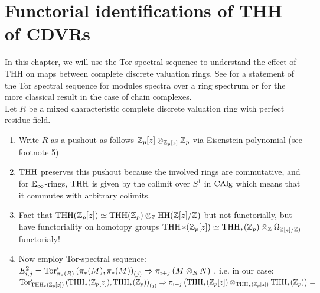\chapter{Functorial identifications of THH of CDVRs}
In this chapter, we will use the Tor-spectral sequence to understand the effect of THH on maps between complete discrete valuation rings.
See \cite[~Proposition 7.2.1.19]{lurie2017higher} for a statement of the Tor spectral sequence for modules spectra over a ring spectrum 
or \cite[\href{https://stacks.math.columbia.edu/tag/061Y}{Tag 061Y}]{stacks-project} for the more classical result in the case of chain complexes.
\\
Let $R$ be a mixed characteristic complete discrete valuation ring with perfect residue field.
\begin{enumerate}
    \item Write $R$ as a pushout as follows $\mathbb{Z}_p[z]\otimes_{\mathbb{Z}_p[z]}\mathbb{Z}_p$ via Eisenstein polynomial (see footnote 5)
    \item $\operatorname{THH}$ preserves this pushout because the involved rings are commutative, and for $\mathbb{E}_\infty$-rings, $\operatorname{THH}$ is given by the colimit over $S^1$ in $\operatorname{CAlg}$ which means that it commutes with arbitrary colimits.
    \item Fact that $\operatorname{THH}(\mathbb{Z}_p[z])\simeq \operatorname{THH}(\mathbb{Z}_p)\otimes_{\mathbb{Z}} \operatorname{HH}(\mathbb{Z}[z]/\mathbb{Z})$ but not functorially, but have functoriality on homotopy groups
    $\operatorname{THH}*(\mathbb{Z}_p[z])\simeq \operatorname{THH}_*(\mathbb{Z}_p)\otimes_{\mathbb{Z}} \Omega_{\mathbb{Z}[z]/\mathbb{Z})}$ functorialy!
    \item Now employ Tor-spectral sequence:\\
     $E^2_{i,j}=\operatorname{Tor}_{\pi_*(R)}^i\left( \pi_*(M), \pi_*(M)\right)_{(j)}\Rightarrow \pi_{i+j}\left( M\otimes_R N \right)$
    , i.e. in our case: 
    \\
    $\operatorname{Tor}_{\operatorname{THH}_*(\mathbb{Z}_p[z])}^i\left( \operatorname{THH}_*(\mathbb{Z}_p[z]),\operatorname{THH}_*(\mathbb{Z}_p)\right)_{(j)}\Rightarrow \pi_{i+j}\left( \operatorname{THH}_*(\mathbb{Z}_p[z])\otimes_{\operatorname{THH}_*(\mathbb{Z}_p[z])} \operatorname{THH}_*(\mathbb{Z}_p) \right)=$

\end{enumerate}
